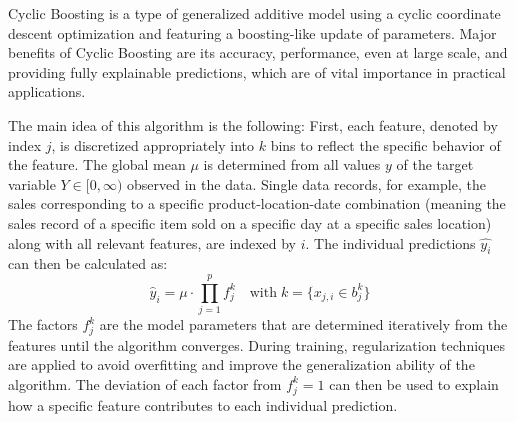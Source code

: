 \documentclass[BCOR=1mm, DIV=calc,10pt,
twoside=true,
twocolumn,
headings=normal]{scrartcl}
\begin{document}
Cyclic Boosting \cite{Wick2019} is a type of generalized additive model using a cyclic coordinate descent optimization and featuring a boosting-like update of parameters. Major benefits of Cyclic Boosting are its accuracy, performance, even at large scale, and providing fully explainable predictions, which are of vital importance in practical applications.

The main idea of this algorithm is the following: First, each feature, denoted by index $j$, is discretized appropriately into $k$ bins to reflect the specific behavior of the feature. The global mean $\mu$ is determined from all values $y$ of the  target variable $Y \in [0,\infty)$ observed in the data. Single data records, for example, the sales corresponding to a specific product-location-date combination (meaning the sales record of a specific item sold on a specific day at a specific sales location) along with all relevant features, are indexed by $i$.
The individual predictions $\hat{y_i}$  can then be calculated as:
\begin{equation} \label{eqn:cb}
\hat{y}_i = \mu \cdot \prod \limits_{j=1}^p f^k_j \quad \text{with}\; k=\{ x_{j,i} \in b^k_j\}
\end{equation}
The factors $f^k_j$ are the model parameters that are determined iteratively from the features until the algorithm converges. During training, regularization techniques are applied to avoid overfitting and improve the generalization ability of the algorithm. The deviation of each factor from $f^k_j=1$ can then be used to explain how a specific feature contributes to each individual prediction.
\end{document}
